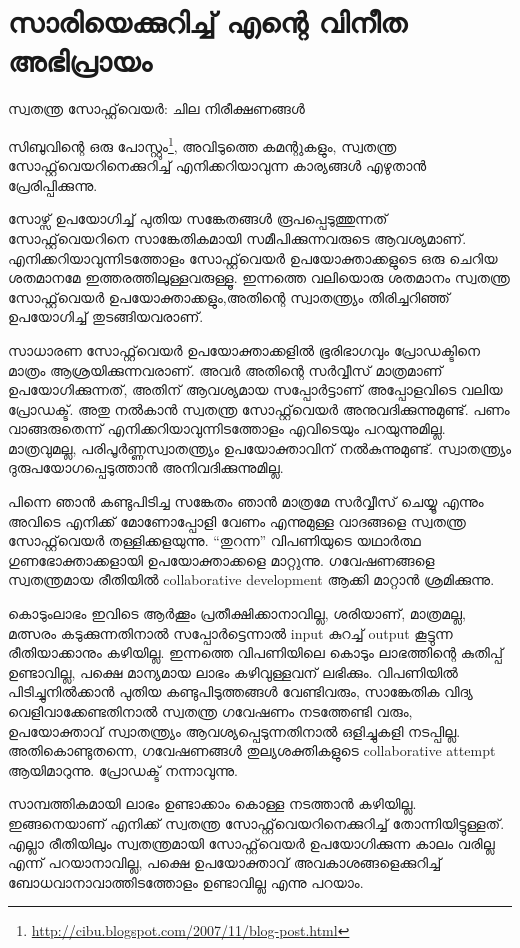 \section*{സാരിയെക്കുറിച്ച് എന്റെ വിനീത അഭിപ്രായം}
\vskip 2pt


സ്വതന്ത്ര സോഫ്റ്റ്‌വെയര്‍: ചില നിരീക്ഷണങ്ങള്‍

സിബുവിന്റെ ഒരു പോസ്റ്റും\footnote{\url{http://cibu.blogspot.com/2007/11/blog-post.html}}, അവിടുത്തെ കമന്റുകളും, സ്വതന്ത്ര സോഫ്റ്റ്‌വെയറിനെക്കുറിച്ച് എനിക്കറിയാവുന്ന കാര്യങ്ങള്‍ എഴുതാന്‍ പ്രേരിപ്പിക്കുന്നു.

സോഴ്സ് ഉപയോഗിച്ച് പുതിയ സങ്കേതങ്ങള്‍ രൂപപ്പെടുത്തുന്നത് സോഫ്റ്റ്‌വെയറിനെ സാങ്കേതികമായി സമീപിക്കുന്നവരുടെ ആവശ്യമാണ്. എനിക്കറിയാവുന്നിടത്തോളം സോഫ്റ്റ്‌വെയര്‍ ഉപയോക്താക്കളുടെ ഒരു ചെറിയ ശതമാനമേ ഇത്തരത്തിലുള്ളവരുള്ളൂ. ഇന്നത്തെ വലിയൊരു ശതമാനം സ്വതന്ത്ര സോഫ്റ്റ്‌വെയര്‍ ഉപയോക്താക്കളും,അതിന്റെ സ്വാതന്ത്ര്യം തിരിച്ചറിഞ്ഞ് ഉപയോഗിച്ച് തുടങ്ങിയവരാണ്.

സാധാരണ സോഫ്റ്റ്‌വെയര്‍ ഉപയോക്താക്കളില്‍ ഭൂരിഭാഗവും പ്രോഡക്ടിനെ മാത്രം ആശ്രയിക്കുന്നവരാണ്. അവര്‍ അതിന്റെ സര്‍വ്വീസ് മാത്രമാണ് ഉപയോഗിക്കുന്നത്, അതിന് ആവശ്യമായ സപ്പോര്‍ട്ടാണ് അപ്പോളവിടെ വലിയ പ്രോഡക്ട്. അതു നല്‍കാന്‍ സ്വതന്ത്ര സോഫ്റ്റ്‌വെയര്‍ അനുവദിക്കുന്നുമുണ്ട്. പണം വാങ്ങരുതെന്ന് എനിക്കറിയാവുന്നിടത്തോളം എവിടെയും പറയുന്നുമില്ല. മാത്രവുമല്ല, പരിപൂര്‍ണ്ണസ്വാതന്ത്ര്യം ഉപയോക്താവിന് നല്‍കുന്നുമുണ്ട്. സ്വാതന്ത്ര്യം ദുരുപയോഗപ്പെടുത്താന്‍ അനിവദിക്കുന്നുമില്ല.

പിന്നെ ഞാന്‍ കണ്ടുപിടിച്ച സങ്കേതം ഞാന്‍ മാത്രമേ സര്‍വ്വീസ് ചെയ്യൂ എന്നും അവിടെ എനിക്ക് മോണോപ്പോളി വേണം എന്നുമുള്ള വാദങ്ങളെ സ്വതന്ത്ര സോഫ്റ്റ്‌വെയര്‍ തള്ളിക്കളയുന്നു. “തുറന്ന” വിപണിയുടെ യഥാര്‍ത്ഥ ഗുണഭോക്താക്കളായി ഉപയോക്താക്കളെ മാറ്റുന്നു. ഗവേഷണങ്ങളെ സ്വതന്ത്രമായ രീതിയില്‍ collaborative development ആക്കി മാറ്റാന്‍ ശ്രമിക്കുന്നു.

കൊടുംലാഭം ഇവിടെ ആര്‍ക്കൂം പ്രതീക്ഷിക്കാനാവില്ല, ശരിയാണ്, മാത്രമല്ല, മത്സരം കടുക്കുന്നതിനാല്‍ സപ്പോര്‍ട്ടെന്നാല്‍ input കുറച്ച് output കൂട്ടുന്ന രീതിയാക്കാനും കഴിയില്ല. ഇന്നത്തെ വിപണിയിലെ കൊടും ലാഭത്തിന്റെ കുതിപ്പ് ഉണ്ടാവില്ല, പക്ഷെ മാന്യമായ ലാഭം കഴിവുള്ളവന് ലഭിക്കും. വിപണിയില്‍ പിടിച്ചുനില്‍ക്കാന്‍ പുതിയ കണ്ടുപിടുത്തങ്ങള്‍ വേണ്ടിവരും, സാങ്കേതിക വിദ്യ വെളിവാക്കേണ്ടതിനാല്‍ സ്വതന്ത്ര ഗവേഷണം നടത്തേണ്ടി വരും, ഉപയോക്താവ് സ്വാതന്ത്ര്യം ആവശ്യപ്പെടുന്നതിനാല്‍ ഒളിച്ചുകളി നടപ്പില്ല. അതികൊണ്ടുതന്നെ, ഗവേഷണങ്ങള്‍ തുല്യശക്തികളുടെ collaborative attempt ആയിമാറുന്നു. പ്രോഡക്ട് നന്നാവുന്നു.

സാമ്പത്തികമായി ലാഭം ഉണ്ടാക്കാം കൊള്ള നടത്താന്‍ കഴിയില്ല. ഇങ്ങനെയാണ് എനിക്ക് സ്വതന്ത്ര സോഫ്റ്റ്‌വെയറിനെക്കുറിച്ച് തോന്നിയിട്ടുള്ളത്. എല്ലാ രീതിയിലും സ്വതന്ത്രമായി സോഫ്റ്റ്‌‌വെയര്‍ ഉപയോഗിക്കുന്ന കാലം വരില്ല എന്ന് പറയാനാവില്ല, പക്ഷെ ഉപയോക്താവ് അവകാശങ്ങളെക്കുറിച്ച് ബോധവാനാവാത്തിടത്തോളം ഉണ്ടാവില്ല എന്നു പറയാം.

